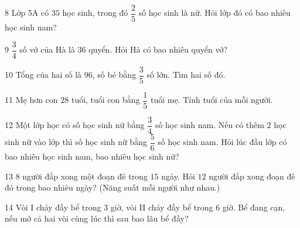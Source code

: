 \gap
\begin{probbox}{8}{\relax}
Lớp 5A có $35$ học sinh, trong đó $\dfrac25$ số học sinh là nữ. Hỏi lớp đó có bao nhiêu học sinh nam?
\end{probbox}
\gap
\begin{probbox}{9}{\relax}
$\dfrac34$ số vở của Hà là $36$ quyển. Hỏi Hà có bao nhiêu quyển vở?
\end{probbox}
\gap
\begin{probbox}{10}{\relax}
Tổng của hai số là $96$, số bé bằng $\dfrac35$ số lớn. Tìm hai số đó.
\end{probbox}
\gap
\begin{probbox}{11}{\relax}
Mẹ hơn con $28$ tuổi, tuổi con bằng $\dfrac15$ tuổi mẹ. Tính tuổi của mỗi người.
\end{probbox}
\gap
\begin{probbox}{12}{\relax}
Một lớp học có số học sinh nữ bằng $\dfrac34$ số học sinh nam. Nếu có thêm $2$ học sinh nữ vào lớp thì số học sinh nữ bằng $\dfrac56$ số học sinh nam. Hỏi lúc đầu lớp có bao nhiêu học sinh nam, bao nhiêu học sinh nữ?
\end{probbox}
\gap
\begin{probbox}{13}{\relax}
$8$ người đắp xong một đoạn đê trong $15$ ngày. Hỏi $12$ người đắp xong đoạn đê đó trong bao nhiêu ngày? (Năng suất mỗi người như nhau.)
\end{probbox}
\gap
\begin{probbox}{14}{\relax}
Vòi I chảy đầy bể trong $3$ giờ, vòi II chảy đầy bể trong $6$ giờ. Bể đang cạn, nếu mở cả hai vòi cùng lúc thì sau bao lâu bể đầy?
\end{probbox}
